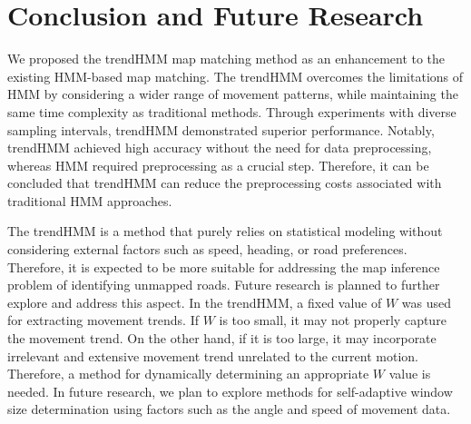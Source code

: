 \documentclass[preprint,12pt]{elsarticle}
\begin{document}
\section{Conclusion and Future Research}
\label{sec:sec5}
We proposed the trendHMM map matching method as an enhancement to the existing HMM-based map matching. The trendHMM overcomes the limitations of HMM by considering a wider range of movement patterns, while maintaining the same time complexity as traditional methods. Through experiments with diverse sampling intervals, trendHMM demonstrated superior performance. Notably, trendHMM achieved high accuracy without the need for data preprocessing, whereas HMM required preprocessing as a crucial step. Therefore, it can be concluded that trendHMM can reduce the preprocessing costs associated with traditional HMM approaches.

The trendHMM is a method that purely relies on statistical modeling without considering external factors such as speed, heading, or road preferences. Therefore, it is expected to be more suitable for addressing the map inference problem of identifying unmapped roads. Future research is planned to further explore and address this aspect.
In the trendHMM, a fixed value of $W$ was used for extracting movement trends. If $W$ is too small, it may not properly capture the movement trend. On the other hand, if it is too large, it may incorporate irrelevant and extensive movement trend unrelated to the current motion. Therefore, a method for dynamically determining an appropriate $W$ value is needed. In future research, we plan to explore methods for self-adaptive window size determination using factors such as the angle and speed of movement data.
\end{document}

